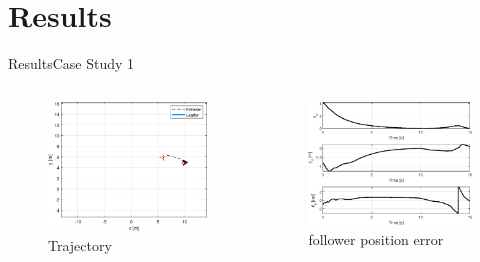 \documentclass{beamer}
\begin{document}
\section{Results}
\begin{frame}{Results}{Case Study 1}
\begin{columns}
\begin{column}{0.5\textwidth}
\begin{figure}
\includegraphics[scale=0.4]{figs/matlab/actorCritic/caseStudy1/trajectory.eps}
\caption{Trajectory}
\end{figure}
\end{column}

\begin{column}{0.5\textwidth}
\begin{center}

\begin{figure}
\includegraphics[scale=0.4]{figs/matlab/actorCritic/caseStudy1/error.eps}
\caption{follower position error}
\end{figure}
\end{center}

\end{column}

\end{columns}

\end{frame}
\end{document}

